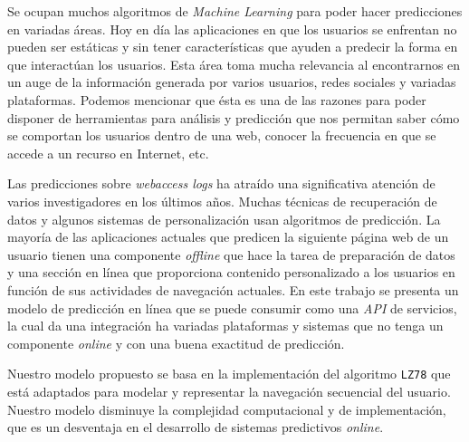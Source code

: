 {Se ocupan muchos algoritmos de \emph{Machine Learning} para poder hacer predicciones en variadas áreas. Hoy en día las aplicaciones en que los usuarios se enfrentan no pueden ser estáticas y sin tener características que ayuden a predecir la forma en que interactúan los usuarios. Esta área toma mucha relevancia al encontrarnos en un auge de la información generada por varios usuarios, redes sociales y variadas plataformas. Podemos mencionar que ésta es una de las razones para poder disponer de herramientas para análisis y predicción que nos permitan saber cómo se comportan los usuarios dentro de una web, conocer la frecuencia en que se accede a un recurso en Internet, etc. 

Las predicciones sobre \emph{webaccess logs} ha atraído una significativa atención de varios investigadores en los últimos años. Muchas técnicas de recuperación de datos y algunos sistemas de personalización usan algoritmos de predicción. La mayoría de las aplicaciones actuales que predicen la siguiente página web de un usuario tienen una componente  \emph{offline} que hace la tarea de preparación de datos y una sección en línea que proporciona contenido personalizado a los usuarios en función de sus actividades de navegación actuales. En este trabajo se presenta un modelo de predicción en línea que se puede consumir como una \emph{API} de servicios, la cual da una integración ha variadas plataformas y sistemas que no tenga un componente \emph{online} y con una buena exactitud de predicción. 

Nuestro modelo propuesto se basa en la implementación del algoritmo \texttt{LZ78} que está adaptados para modelar y representar la navegación secuencial del usuario. Nuestro modelo disminuye la complejidad computacional  y de implementación, que es un desventaja en el desarrollo de sistemas predictivos \emph{online}.
}

  
